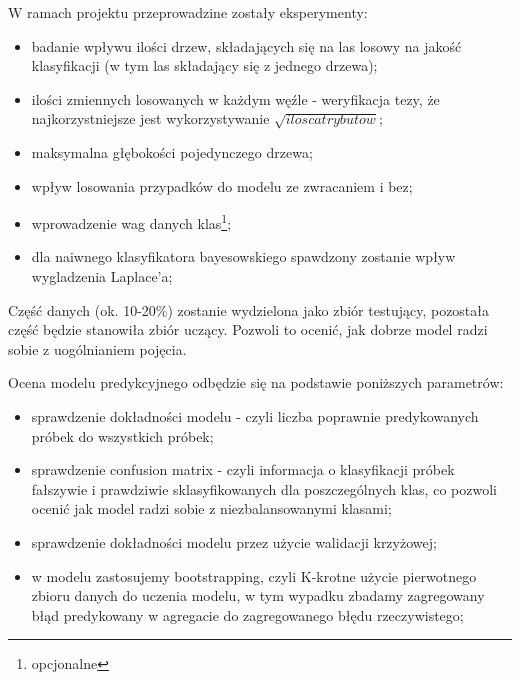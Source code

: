 
W ramach projektu przeprowadzine zostały eksperymenty:
\begin{itemize}
    \item badanie wpływu ilości drzew, składających się na las losowy na jakość klasyfikacji (w tym las składający się z jednego drzewa);
    \item ilości zmiennych losowanych w każdym węźle - weryfikacja tezy, że najkorzystniejsze jest wykorzystywanie $\sqrt {ilosc atrybutow}$;
    \item maksymalna głębokości pojedynczego drzewa;
    \item wpływ losowania przypadków do modelu ze zwracaniem i bez;
    
    
    \item wprowadzenie wag danych klas\footnote[1]{opcjonalne};
    \item dla naiwnego klasyfikatora bayesowskiego spawdzony zostanie wpływ wygladzenia Laplace'a;
        
\end{itemize}

Część danych (ok. 10-20\%) zostanie wydzielona jako zbiór testujący, pozostała część będzie stanowiła zbiór uczący. Pozwoli to ocenić, jak dobrze model radzi sobie z uogólnianiem pojęcia. 

Ocena modelu predykcyjnego odbędzie się na podstawie poniższych parametrów:
\begin{itemize}
        
 
    \item sprawdzenie dokładności modelu - czyli liczba poprawnie predykowanych próbek do wszystkich próbek;    
    \item sprawdzenie confusion matrix - czyli informacja o klasyfikacji próbek fałszywie i prawdziwie sklasyfikowanych dla poszczególnych klas, co pozwoli ocenić jak model radzi sobie z niezbalansowanymi klasami;

    \item sprawdzenie dokładności modelu przez użycie walidacji krzyżowej;
    \item w modelu zastosujemy bootstrapping, czyli K-krotne użycie pierwotnego zbioru danych do uczenia modelu, w tym wypadku zbadamy zagregowany błąd predykowany w agregacie do zagregowanego błędu rzeczywistego;
\end{itemize}

